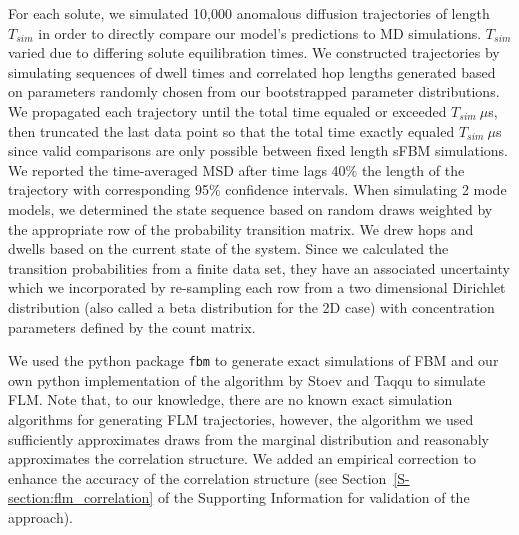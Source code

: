 \documentclass{article}
\begin{document}
  For each solute, we simulated 10,000 anomalous diffusion trajectories of length
  $T_{sim}$ in order to directly compare our model's predictions to MD simulations.
  $T_{sim}$ varied due to differing solute equilibration times. We constructed 
  trajectories by simulating sequences of dwell times and correlated hop lengths
  generated based on parameters randomly chosen from our bootstrapped parameter 
  distributions. We propagated each trajectory until the total time equaled or 
  exceeded $T_{sim}~ \mu$s, then truncated the last data point so that the total 
  time exactly equaled $T_{sim}~ \mu$s since valid comparisons are only possible 
  between fixed length sFBM simulations. 
  We reported the time-averaged MSD after time lags 40\% the length of the trajectory
  with corresponding 95\% confidence intervals.
  When simulating 2 mode models, we determined the state sequence based on random 
  draws weighted by the appropriate row of the probability transition matrix. We 
  drew hops and dwells based on the current state of the system. Since we calculated
  the transition probabilities from a finite data set, they have an associated 
  uncertainty which we 
  incorporated by re-sampling each row from a two dimensional Dirichlet distribution
  (also called a beta distribution for the 2D case) with concentration parameters 
  defined by the count matrix.~\cite{bacallado_bayesian_2009}

  
  We used the python package \texttt{fbm} to generate exact simulations of FBM and our
  own python implementation of the algorithm by Stoev and Taqqu to simulate FLM.
  \cite{stoev_simulation_2004} Note that, to our knowledge, there are no known exact
  simulation algorithms for generating FLM trajectories, however, the algorithm
  we used sufficiently approximates draws from the marginal distribution and 
  reasonably approximates the correlation structure. We added an empirical correction
  to enhance the accuracy of the correlation structure (see Section~\ref{S-section:flm_correlation}
  of the Supporting Information for validation of the approach).
  
\end{document}
